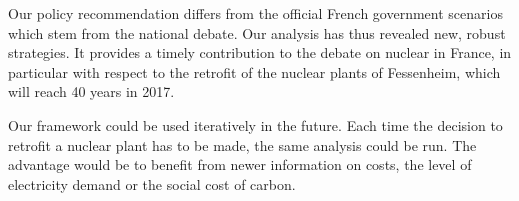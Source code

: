 Our policy recommendation differs from the official French government scenarios which stem from the national debate. Our analysis has thus revealed new, robust strategies. It provides a timely contribution to the debate on nuclear in France, in particular with respect to the retrofit of the nuclear plants of Fessenheim, which will reach 40 years in 2017.

Our framework could be used iteratively in the future. Each time the decision to retrofit a nuclear plant has to be made, the same analysis could be run. The advantage would be to benefit from newer information on costs, the level of electricity demand or the social cost of carbon.

